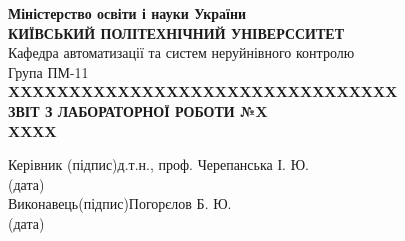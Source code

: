 \documentclass[a4paper,14pt]{article}
\begin{document}
\begin{titlepage}
    \centering
    \textbf{Міністерство освіти і науки України}\\
    \textbf{КИЇВСЬКИЙ ПОЛІТЕХНІЧНИЙ УНІВЕРССИТЕТ}\\[5cm]
    \raggedleft
    Кафедра автоматизації та систем неруйнівного контролю\\
    Група ПМ-11\\[4cm]
    \centering
    \textbf{XXXXXXXXXXXXXXXXXXXXXXXXXXXXXXXX}\\[1cm]
    \textbf{ЗВІТ З ЛАБОРАТОРНОЇ РОБОТИ №X}\\[1cm]
    \textbf{XXXX}\\[3cm]
    \begin{flushleft}
        Керівник  \qquad \hfill\qquad (підпис)\hfill д.т.н., проф. Черепанська І. Ю.\\
        \hfill (дата)\\[2cm]
        Виконавець\hfill (підпис)\hfill Погорєлов Б. Ю.\\
        \hfill (дата)\\[2cm]
    \end{flushleft}
\end{titlepage}
\end{document}
